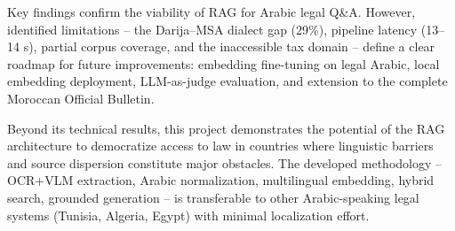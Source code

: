 Key findings confirm the viability of RAG for Arabic legal Q\&A. However,
identified limitations -- the Darija--MSA dialect gap (29\%), pipeline latency
(13--14 s), partial corpus coverage, and the inaccessible tax domain -- define
a clear roadmap for future improvements: embedding fine-tuning on legal
Arabic, local embedding deployment, LLM-as-judge evaluation, and extension to
the complete Moroccan Official Bulletin.

Beyond its technical results, this project demonstrates the potential of the
RAG architecture to democratize access to law in countries where linguistic
barriers and source dispersion constitute major obstacles. The developed
methodology -- OCR+VLM extraction, Arabic normalization, multilingual
embedding, hybrid search, grounded generation -- is transferable to other
Arabic-speaking legal systems (Tunisia, Algeria, Egypt) with minimal
localization effort.
